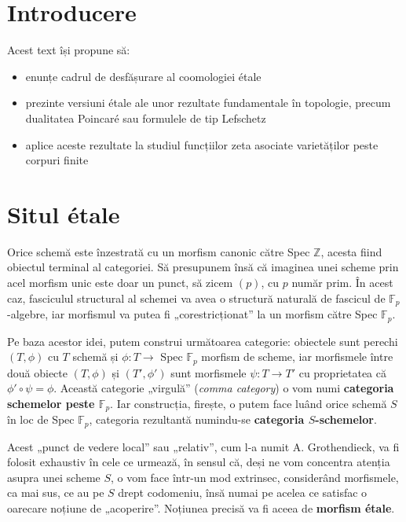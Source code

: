 \documentclass[13pt,openany]{book}
\begin{document}
\chapter{Introducere}

Acest text își propune să:

\begin{itemize}
\item enunțe cadrul de desfășurare al coomologiei étale
\item prezinte versiuni étale ale unor rezultate fundamentale în topologie, precum dualitatea Poincaré sau formulele de tip Lefschetz
\item aplice aceste rezultate la studiul funcțiilor zeta asociate varietăților peste corpuri finite
\end{itemize}

\cite{milne}\cite{lovering}\cite{dugger}

\newpage
\phantom{X}
\newpage

\pagestyle{headings}
\setcounter{secnumdepth}{2}

\chapter{Situl étale}
\setcounter{page}{1}

Orice schemă este înzestrată cu un morfism canonic către Spec $\mathbb{Z}$, acesta fiind obiectul terminal al categoriei. Să presupunem însă că imaginea unei scheme prin acel morfism unic este doar un punct, să zicem $(p)$, cu $p$ număr prim. În acest caz, fasciculul structural al schemei va avea o structură naturală de fascicul de $\mathbb{F}_p$-algebre, iar morfismul va putea fi „corestricționat” la un morfism către Spec $\mathbb{F}_p$.

Pe baza acestor idei, putem construi următoarea categorie: obiectele sunt perechi $(T,\phi)$ cu $T$ schemă și $\phi: T \rightarrow$ Spec $\mathbb{F}_p$ morfism de scheme, iar morfismele între două obiecte $(T,\phi)$ și $(T',\phi')$ sunt morfismele $\psi: T \rightarrow T'$ cu proprietatea că $\phi'\circ\psi=\phi$. Această categorie „virgulă” ({\it comma category}) o vom numi {\bf categoria schemelor peste $\mathbb{F}_p$}. Iar construcția, firește, o putem face luând orice schemă $S$ în loc de Spec $\mathbb{F}_p$, categoria rezultantă numindu-se {\bf categoria $S$-schemelor}.

Acest „punct de vedere local” sau „relativ”, cum l-a numit A. Grothendieck, va fi folosit exhaustiv în cele ce urmează, în sensul că, deși ne vom concentra atenția asupra unei scheme $S$, o vom face într-un mod extrinsec, considerând morfismele, ca mai sus, ce au pe $S$ drept codomeniu, însă numai pe acelea ce satisfac o oarecare noțiune de „acoperire”. Noțiunea precisă va fi aceea de {\bf morfism étale}.
\end{document}
